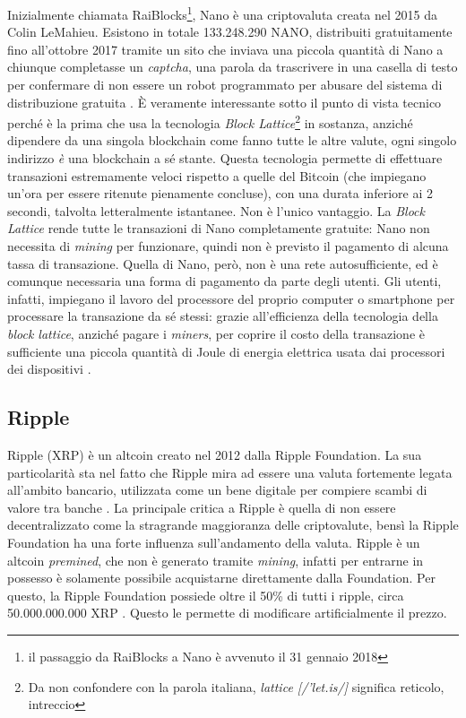 \documentclass {article}
\begin{document}
Inizialmente chiamata RaiBlocks\footnote{il passaggio da RaiBlocks a Nano è avvenuto il 31 gennaio 2018}, Nano è una criptovaluta creata nel 2015 da Colin LeMahieu.
Esistono in totale 133.248.290 NANO, distribuiti gratuitamente fino all'ottobre 2017 tramite un sito che inviava una piccola quantità di Nano a chiunque completasse un \textit{captcha}, una parola da trascrivere in una casella di testo per confermare di non essere un robot programmato per abusare del sistema di distribuzione gratuita \cite{nanofaq}.
È veramente interessante sotto il punto di vista tecnico perché è la prima che usa la tecnologia \textit{Block Lattice}\footnote{Da non confondere con la parola italiana, \textit{lattice [/'let.is/]} significa reticolo, intreccio} in sostanza, anziché dipendere da una singola blockchain come fanno tutte le altre valute, ogni singolo indirizzo \emph{è} una blockchain a sé stante.
Questa tecnologia permette di effettuare transazioni estremamente veloci rispetto a quelle del Bitcoin (che impiegano un'ora per essere ritenute pienamente concluse), con una durata inferiore ai 2 secondi, talvolta letteralmente istantanee.
Non è l'unico vantaggio.
La \textit{Block Lattice} rende tutte le transazioni di Nano completamente gratuite: Nano non necessita di \textit{mining} per funzionare, quindi non è previsto il pagamento di alcuna tassa di transazione.
Quella di Nano, però, non è una rete autosufficiente, ed è comunque necessaria una forma di pagamento da parte degli utenti.
Gli utenti, infatti, impiegano il lavoro del processore del proprio computer o smartphone per processare la transazione da sé stessi: grazie all'efficienza della tecnologia della \textit{block lattice}, anziché pagare i \textit{miners}, per coprire il costo della transazione è sufficiente una piccola quantità di Joule di energia elettrica usata dai processori dei dispositivi \cite{nanopow}.


\subsection {Ripple}


Ripple (XRP) è un altcoin creato nel 2012 dalla Ripple Foundation.
La sua particolarità sta nel fatto che Ripple mira ad essere una valuta fortemente legata all'ambito bancario, utilizzata come un bene digitale per compiere scambi di valore tra banche \cite{whatsripple}.
La principale critica a Ripple è quella di non essere decentralizzato come la stragrande maggioranza delle criptovalute, bensì la Ripple Foundation ha una forte influenza sull'andamento della valuta.
Ripple è un altcoin \textit{premined}, che non è generato tramite \textit{mining}, infatti per entrarne in possesso è solamente possibile acquistarne direttamente dalla Foundation.
Per questo, la Ripple Foundation possiede oltre il 50\% di tutti i ripple, circa 50.000.000.000 XRP \cite{ripple}. Questo le permette di modificare artificialmente il prezzo.
\end{document}
